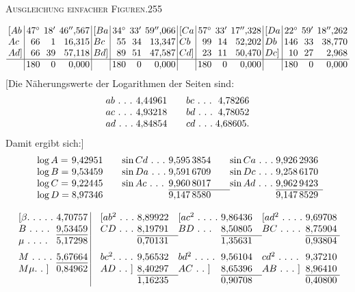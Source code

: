 \clearpage
\noindent\mbox{}\hfill\textsc{Ausgleichung einfacher Figuren.}\hfill255\par\medskip
\[
\setlength{\arraycolsep}{2pt}
\begin{array}{l|rrr|l|rrr|l|rrr|l|rrr}
[Ab&47^\circ&18'&46''{,}567&[Ba&34^\circ&33'&59''{,}066&[Ca&57^\circ&33'&17''{,}328&[Da&22^\circ&59'&18''{,}262\\
Ac&66&1&16{,}315&Bc&55&34&13{,}347&Cb&99&14&52{,}202&Db&146&33&38{,}770\\
Ad]&66&39&57{,}118&Bd]&89&51&47{,}587&Cd]&23&11&50{,}470&Dc]&10&27&2{,}968\\ \hline
&180&0&0{,}000&&180&0&0{,}000&&180&0&0{,}000&&180&0&0{,}000
\end{array}
\]
[Die Näherungswerte der Logarithmen der Seiten sind:
\[
\begin{array}{l@{\;}r@{\qquad}l@{\;}r}
ab\ .\ .\ .&4{,}44961&bc\ .\ .\ .&4{,}78266\\
ac\ .\ .\ .&4{,}93218&bd\ .\ .\ .&4{,}78052\\
ad\ .\ .\ .&4{,}84854&cd\ .\ .\ .&4{,}68605.
\end{array}
\]
Damit ergibt sich:]
\[
\begin{array}{l@{\;}r@{\qquad}l@{\;}r@{\qquad}l@{\;}r}
\log A=&9{,}42951&\sin Cd\ .\ .\ .&9{,}595\,3854&\sin Ca\ .\ .\ .&9{,}926\,2936\\
\log B=&9{,}53459&\sin Da\ .\ .\ .&9{,}591\,6709&\sin Dc\ .\ .\ .&9{,}258\,6170\\
\log C=&9{,}22445&\sin Ac\ .\ .\ .&9{,}960\,8017&\sin Ad\ .\ .\ .&9{,}962\,9423\\ \cline{4-4}\cline{6-6}
\log D=&8{,}97346&&9{,}147\,8580&&9{,}147\,8529
\end{array}
\]
\noindent\makebox[\linewidth][c]{\hspace{.27\linewidth}$[\beta=0{,}000\,0051]$}\par\medskip
\[
\setlength{\arraycolsep}{3pt}
\begin{array}{l@{}r|@{\quad}l@{}r@{\quad}l@{}r@{\quad}l@{}r}
[\beta.\ .\ .\ .\ .\ &4{,}70757&[ab^2\ .\ .\ .\ &8{,}89922&[ac^2\ .\ .\ .\ .\ &\rlap{\raisebox{1.5ex}{\text{\tiny.}}}9{,}86436&[ad^2\ .\ .\ .\ .\ &9{,}69708\\
B\ .\ .\ .\ .\ &\underline{9{,}53459}&CD\ .\ .\ .\ &8{,}19791&BD\ .\ .\ .\ &8{,}50805&BC\ .\ .\ .\ .\ &8{,}75904\\ \cline{4-4}\cline{6-6}\cline{8-8}
\mu\ .\ .\ .\ .\ &5{,}17298&&0{,}70131&&1{,}35631&&0{,}93804\\[5pt]
M\ .\ .\ .\ .\ &\underline{5{,}67664}&bc^2.\ .\ .\ .\ &9{,}56532&bd^2\ .\ .\ .\ .\ &9{,}56104&cd^2\ .\ .\ .\ .\ &9{,}37210\\ 
M\mu.\ .\ ]&0{,}84962&AD\ .\ .\ ]&8{,}40297&AC\ .\ .\ ]&8{,}65396&AB\ .\ .\ .\ ]&8{,}96410\\ \cline{4-4}\cline{6-6}\cline{8-8}
&&&1{,}16235&&0{,}90708&&0{,}40800
\end{array}
\]
